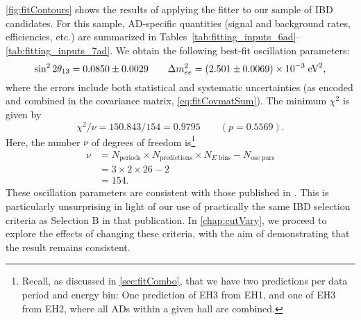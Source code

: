 \documentclass[../thesis.tex]{subfiles}
\begin{document}
\autoref{fig:fitContours} shows the results of applying the fitter to our sample of IBD candidates. For this sample, AD-specific quantities (signal and background rates, efficiencies, etc.) are summarized in Tables~\ref{tab:fitting_inputs_6ad}--\ref{tab:fitting_inputs_7ad}. We obtain the following best-fit oscillation parameters:
\begin{equation}
    \sin^2 2\theta_{13} = 0.0850 \pm 0.0029 \qquad \Delta m^2_{ee} = (2.501 \pm 0.0069)\times10^{-3}\;\text{eV}^2,
  \label{eq:fitResults}
\end{equation}
where the errors include both statistical and systematic uncertainties (as encoded and combined in the covariance matrix, \autoref{eq:fitCovmatSum}). The minimum $\chi^2$ is given by
\begin{equation}
  \chi^2 / \nu = 150.843 / 154 = 0.9795 \qquad (p = 0.5569).
\end{equation}
Here, the number $\nu$ of degrees of freedom is\footnote{Recall, as discussed in \autoref{sec:fitCombo}, that we have two predictions per data period and energy bin: One prediction of EH3 from EH1, and one of EH3 from EH2, where all ADs within a given hall are combined.}
\begin{equation}
  \begin{aligned}
    \nu &= N_{\mathrm{periods}} \times N_{\mathrm{predictions}} \times N_{E\;\mathrm{bins}} - N_{\mathrm{osc\;pars}} \\
    &= 3 \times 2 \times 26 - 2 \\
    &= 154.
  \end{aligned}
\end{equation}
These oscillation parameters are consistent with those published in \cite{An_2017}. This is particularly unsurprising in light of our use of practically the same IBD selection criteria as Selection B in that publication. In \autoref{chap:cutVary}, we proceed to explore the effects of changing these criteria, with the aim of demonstrating that the result remains consistent.

\end{document}
